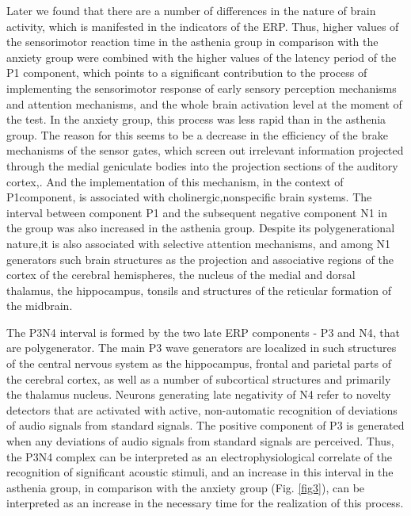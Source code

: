 \documentclass[twocolumn]{article}
\begin{document}
\par Later we found that there are a number of differences in the nature of brain activity, which is manifested in the indicators of the ERP. Thus, higher values of the sensorimotor reaction time in the asthenia group in comparison with the anxiety group were combined with the higher values of the latency period of the P1 component, which points to a significant contribution to the process of implementing the sensorimotor response of early sensory perception mechanisms and attention mechanisms, and the whole brain activation level at the moment of the test\cite{bib17}. In the anxiety group, this process was less rapid than in the asthenia group. The reason for this seems to be a decrease in the efficiency of the brake mechanisms of the sensor gates, which screen out irrelevant information projected through the medial geniculate bodies into the projection sections of the auditory cortex\cite{bib18},\cite{bib19}. And the implementation of this mechanism, in the context of P1component, is associated with cholinergic\cite{bib20},\cite{bib21}nonspecific brain systems. The interval between component P1 and the subsequent negative component N1 in the group was also increased in the asthenia group. Despite its polygenerational nature,\cite{bib22}it is also associated with selective attention mechanisms\cite{bib23}, and among N1 generators such brain structures as the projection and associative regions of the cortex of the cerebral hemispheres, the nucleus of the medial and dorsal thalamus, the hippocampus, tonsils and structures of the reticular formation of the midbrain\cite{bib24}.
\par The P3N4 interval is formed by the two late ERP components - P3 and N4, that are polygenerator. The main P3 wave generators are localized in such structures of the central nervous system as the hippocampus, frontal and parietal parts of the cerebral cortex\cite{bib25}, as well as a number of subcortical structures and primarily the thalamus nucleus\cite{bib26}. Neurons generating late negativity of N4 refer to novelty detectors that are activated with active, non-automatic recognition of deviations of audio signals from standard signals. The positive component of P3 is generated when any deviations of audio signals from standard signals are perceived\cite{bib27}. Thus, the P3N4 complex can be interpreted as an electrophysiological correlate of the recognition of significant acoustic stimuli, and an increase in this interval in the asthenia group, in comparison with the anxiety group (Fig. \ref{fig3}), can be interpreted as an increase in the necessary time for the realization of this process.
\end{document}
